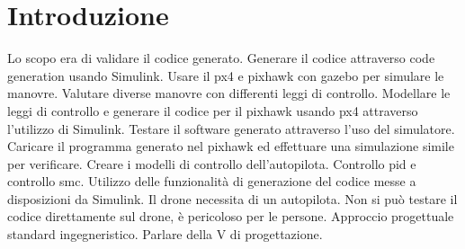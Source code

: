 \chapter{Introduzione}
Lo scopo era di validare il codice generato.
Generare il codice attraverso code generation usando Simulink.
Usare il px4 e pixhawk con gazebo per simulare le manovre.
Valutare diverse manovre con differenti leggi di controllo.
Modellare le leggi di controllo e generare il codice per il pixhawk usando px4 attraverso l'utilizzo di Simulink.
Testare il software generato attraverso l'uso del simulatore. Caricare il programma generato nel pixhawk ed effettuare una simulazione simile per verificare.
Creare i modelli di controllo dell'autopilota.
Controllo pid e controllo smc.
Utilizzo delle funzionalità di generazione del codice messe a disposizioni da Simulink.
Il drone necessita di un autopilota.
Non si può testare il codice direttamente sul drone, è pericoloso per le persone.
Approccio progettuale standard ingegneristico.
Parlare della V di progettazione.